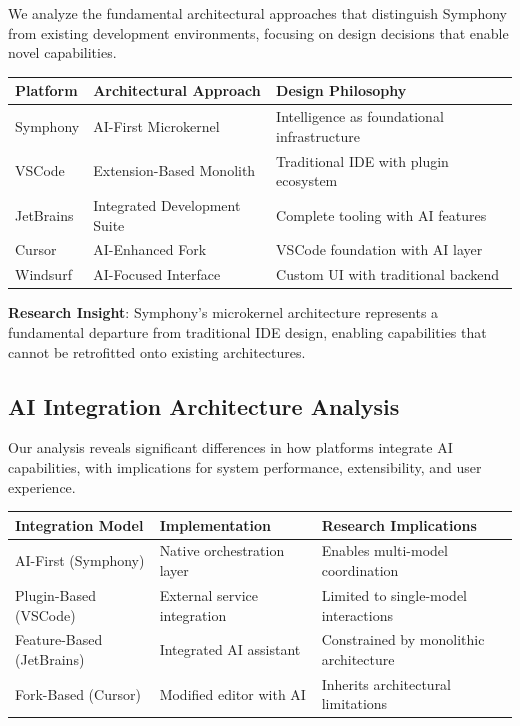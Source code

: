 We analyze the fundamental architectural approaches that distinguish Symphony from existing development environments, focusing on design decisions that enable novel capabilities.

\begin{center}
\begin{tabular}{@{}p{3cm}p{4cm}p{5cm}@{}}
\toprule
\textbf{Platform} & \textbf{Architectural Approach} & \textbf{Design Philosophy} \\
\midrule
Symphony & AI-First Microkernel & Intelligence as foundational infrastructure \\
VSCode & Extension-Based Monolith & Traditional IDE with plugin ecosystem \\
JetBrains & Integrated Development Suite & Complete tooling with AI features \\
Cursor & AI-Enhanced Fork & VSCode foundation with AI layer \\
Windsurf & AI-Focused Interface & Custom UI with traditional backend \\
\bottomrule
\end{tabular}
\label{tab:architectural-philosophy}
\end{center}

\textbf{Research Insight}: Symphony's microkernel architecture represents a fundamental departure from traditional IDE design, enabling capabilities that cannot be retrofitted onto existing architectures.

\subsection{AI Integration Architecture Analysis}
\label{subsec:ai-integration-analysis}

Our analysis reveals significant differences in how platforms integrate AI capabilities, with implications for system performance, extensibility, and user experience.

\begin{center}
\begin{tabular}{@{}p{3cm}p{4cm}p{5cm}@{}}
\toprule
\textbf{Integration Model} & \textbf{Implementation} & \textbf{Research Implications} \\
\midrule
AI-First (Symphony) & Native orchestration layer & Enables multi-model coordination \\
Plugin-Based (VSCode) & External service integration & Limited to single-model interactions \\
Feature-Based (JetBrains) & Integrated AI assistant & Constrained by monolithic architecture \\
Fork-Based (Cursor) & Modified editor with AI & Inherits architectural limitations \\
\bottomrule
\end{tabular}
\label{tab:ai-integration-analysis}
\end{center}

